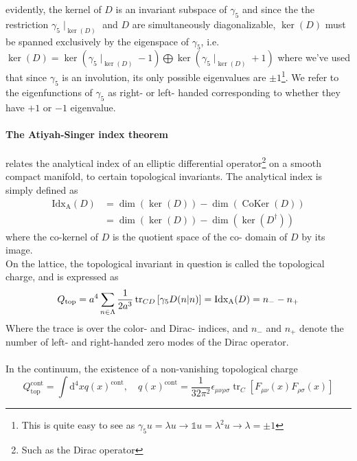 \documentclass[a4paper,10pt]{article}
\begin{document}
evidently, the kernel of $D$ is an invariant subspace of $\gamma_5$ and since the the restriction $\gamma_5\mid_{\operatorname{ker}(D)}$ and $D$ are simultaneously diagonalizable, $\operatorname{ker}(D)$ must be spanned exclusively by the eigenspace of $\gamma_5$, i.e. $\operatorname{ker}(D) = \operatorname{ker}\left( \gamma_5\mid_{\operatorname{ker}(D)} -1 \right) \bigoplus\operatorname{ker}\left( \gamma_5\mid_{\operatorname{ker}(D)} +1 \right)$ where we've used that since $\gamma_5$ is an involution, its only possible eigenvalues are $\pm1$\footnote{This is quite easy to see as $\gamma_5 u = \lambda u\rightarrow \mathbb{1} u = \lambda^2 u\rightarrow \lambda=\pm1$}. We refer to the eigenfunctions of $\gamma_5$ as right- or left- handed corresponding to whether they have $+1$ or $-1$ eigenvalue.\paragraph{The Atiyah-Singer index theorem} relates the analytical index of an elliptic differential operator\footnote{Such as the Dirac operator} on a smooth compact manifold, to certain topological invariants. The analytical index is simply defined as
\begin{equation}
\begin{aligned} 
\operatorname{Idx_A}(D) &= \operatorname{dim}(\operatorname{ker}(D))-\operatorname{dim}(\operatorname{CoKer}(D))\\&= \operatorname{dim}(\operatorname{ker}(D))-\operatorname{dim}(\operatorname{ker}(D^\dagger))
\end{aligned} 
\end{equation}
where the co-kernel of $D$ is the quotient space of the co- domain of $D$ by its image.\\On the lattice, the topological invariant in question is called the topological charge, and is expressed as 
\begin{equation}\label{eq:topCharge_DiracOperator_index}
Q_{\mathrm{top}}=a^{4} \sum_{n \in \Lambda} \frac{1}{2 a^{3}} \operatorname{tr}_{C D}\left[\gamma_{5} D(n\mkern-5mu\mid\mkern-5mu n)\right]=\operatorname{Idx_A}(D)=n_{-}-n_{+}
\end{equation}
Where the trace is over the color- and Dirac- indices, and $n_-$ and $n_+$ denote the number of left- and right-handed zero modes of the Dirac operator.\\\\In the continuum, the existence of a non-vanishing topological charge
\begin{equation}\label{eq:topological_charge_continuum}
Q_{\mathrm{top}}^{\mathrm{cont}}=\int \mathrm{d}^{4} x q(x)^{\mathrm{cont}}, \quad q(x)^{\mathrm{cont}}=\frac{1}{32 \pi^{2}} \epsilon_{\mu \nu \rho \sigma} \operatorname{tr}_{C}\left[F_{\mu \nu}(x) F_{\rho \sigma}(x)\right]
\end{equation}
\end{document}

